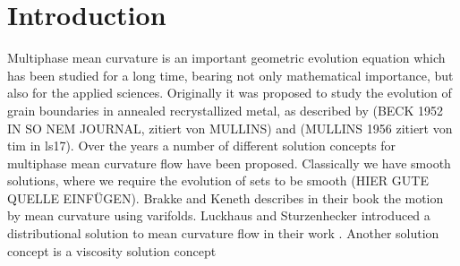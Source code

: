 \chapter{Introduction}

Multiphase mean curvature is an important geometric evolution equation which 
has been studied for a long time, bearing not only mathematical importance, but 
also for the applied sciences. Originally it was proposed to study the 
evolution of grain boundaries in annealed recrystallized metal, as described by 
(BECK 1952 IN SO NEM JOURNAL, zitiert von MULLINS) and (MULLINS 1956 zitiert 
von tim in ls17).
Over the years a number of different solution concepts for multiphase mean 
curvature flow have been proposed. Classically we have smooth solutions, where 
we require the evolution of sets to be smooth (HIER GUTE QUELLE EINFÜGEN).
Brakke and Keneth describes in their book 
\cite{brakke_kenneth_motion_of_surface_by_mean_curvature} the motion by mean 
curvature using varifolds. Luckhaus and Sturzenhecker introduced a 
distributional solution to mean curvature flow in their work 
\cite{luckhaus_sturzenhecker_implicit_time_discretization_for_mcf}. Another 
solution concept is a viscosity solution concept